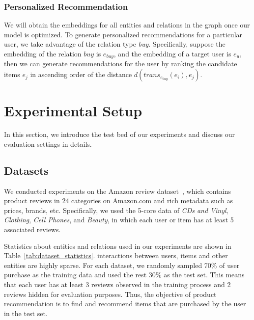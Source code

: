 \documentclass[algorithms,article,accept,moreauthors,pdftex,10pt,a4paper]{Definitions/mdpi}
\begin{document}
\subsubsection{Personalized Recommendation}
We will obtain the embeddings for all entities and relations in the graph once our model is optimized. To generate personalized recommendations for a particular user, we take advantage of the relation type \textit{buy}. Specifically, suppose the embedding of the relation $buy$ is $e_{buy}$, and the embedding of a target user is $e_u$, then we can generate recommendations for the user by ranking the candidate items $e_j$ in ascending order of the distance $d(trans_{e_{buy}}(e_i), e_j)$.
\fi





\section{Experimental Setup}\label{sec:setup}


In this section, we introduce the test bed of our experiments and discuss our evaluation settings in details.

\subsection{Datasets}
We conducted experiments on the Amazon review dataset~\cite{mcauley2015image}, which contains product reviews in 24 categories on Amazon.com and rich metadata such as prices, brands, etc.
Specifically, we used the 5-core data of \textit{CDs and Vinyl}, \textit{Clothing}, \textit{Cell Phones}, and \textit{Beauty}, in which each user or item has at least 5 associated reviews.


Statistics about entities and relations used in our experiments are shown in Table~\ref{tab:dataset_statistics}. 
 interactions between users, items and other entities are highly sparse.
For each dataset, we randomly sampled 70\% of user purchase as the training data and used the rest 30\% as the test set. 
This means that each user has at least 3 reviews observed in the training process and 2 reviews hidden for evaluation purposes.
Thus, the objective of product recommendation is to find and recommend items that are purchased by the user in the test set.
\end{document}
